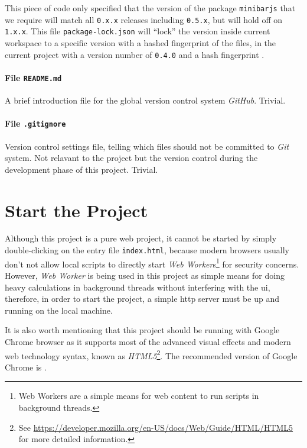 This piece of code only specified that the version of the package \texttt{minibarjs} that we require will match all \texttt{0.x.x} releases including \texttt{0.5.x}, but will hold off on \texttt{1.x.x}. This file \texttt{package-lock.json} will ``lock'' the version inside current workspace to a specific version with a hashed fingerprint of the files, in the current project with a version number of \texttt{0.4.0} and a hash fingerprint .

\paragraph{File \texttt{README.md}}

A brief introduction file for the global version control system \emph{GitHub}. Trivial.

\paragraph{File \texttt{.gitignore}}

Version control settings file, telling which files should not be committed to \emph{Git} system. Not relavant to the project but the version control during the development phase of this project. Trivial.


\section{Start the Project}

Although this project is a pure web project, it cannot be started by simply double-clicking on the entry file \texttt{index.html}, because modern browsers usually don't not allow local scripts to directly start \emph{Web Worker}s\footnote{ Web Workers are a simple means for web content to run scripts in background threads.\cite{bib:moz:webworker}} for security concerns. However, \emph{Web Worker} is being used in this project as simple means for doing heavy calculations in background threads without interfering with the \gls{ui}, therefore, in order to start the project, a simple \gls{http} server must be up and running on the local machine.

It is also worth mentioning that this project should be running with Google Chrome browser as it supports most of the advanced visual effects and modern web technology syntax, known as \emph{HTML5}\footnote{ See \url{https://developer.mozilla.org/en-US/docs/Web/Guide/HTML/HTML5} for more detailed information.}. The recommended version of Google Chrome is .

